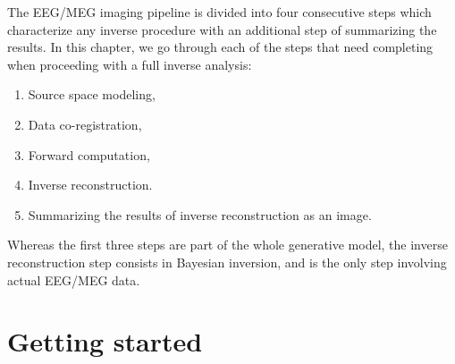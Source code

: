 The EEG/MEG imaging pipeline is divided into four consecutive steps which characterize any inverse procedure with an additional step of summarizing the results. In this chapter, we go through each of the steps that need completing when proceeding with a full inverse analysis:

\begin{enumerate}
    \item Source space modeling,
    \item Data co-registration,
    \item Forward computation,
    \item Inverse reconstruction.
    \item Summarizing the results of inverse reconstruction as an image.
\end{enumerate}

Whereas the first three steps are part of the whole generative model, the inverse reconstruction step consists in Bayesian inversion, and is the only step involving actual EEG/MEG data.\\

\section{Getting started}

